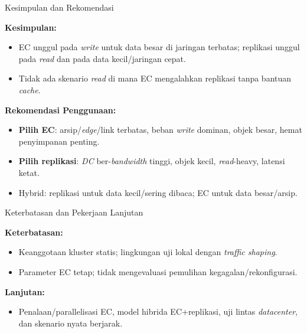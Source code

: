 \documentclass[a2,portrait]{config/poster/a0poster}
\newcommand{\postersection}[1]{%
	\begin{tcolorbox}[
		colback=ITBblue,
		colframe=ITBblue,
		fonttitle=\bfseries,
		coltext=white,
		sharp corners,
		boxrule=0pt,
		top=0pt,
		bottom=0pt,
		halign=center
	]
	\normalsize #1
	\end{tcolorbox}%
}
\begin{document}
\begin{multicols}{2}

\postersection{Kesimpulan dan Rekomendasi}
			\textbf{Kesimpulan:}
\begin{itemize}[leftmargin=*, itemsep=2pt]
	\item EC unggul pada \textit{write} untuk data besar di jaringan terbatas; replikasi unggul pada \textit{read} dan pada data kecil/jaringan cepat.
	\item Tidak ada skenario \textit{read} di mana EC mengalahkan replikasi tanpa bantuan \textit{cache}.
\end{itemize}
			\textbf{Rekomendasi Penggunaan:}
\begin{itemize}[leftmargin=*, itemsep=2pt]
	\item \textbf{Pilih EC}: arsip/\textit{edge}/link terbatas, beban \textit{write} dominan, objek besar, hemat penyimpanan penting.
	\item \textbf{Pilih replikasi}: \textit{DC} ber-\textit{bandwidth} tinggi, objek kecil, \textit{read}-heavy, latensi ketat.
	\item Hybrid: replikasi untuk data kecil/sering dibaca; EC untuk data besar/arsip.
\end{itemize}


\postersection{Keterbatasan dan Pekerjaan Lanjutan}
			\textbf{Keterbatasan:}
\begin{itemize}[leftmargin=*, itemsep=2pt]
	\item Keanggotaan kluster statis; lingkungan uji lokal dengan \textit{traffic shaping}.
	\item Parameter EC tetap; tidak mengevaluasi pemulihan kegagalan/rekonfigurasi.
\end{itemize}
			\textbf{Lanjutan:}
\begin{itemize}[leftmargin=*, itemsep=2pt]
	\item Penalaan/parallelisasi EC, model hibrida EC+replikasi, uji lintas \textit{datacenter}, dan skenario nyata berjarak.
\end{itemize}



\end{multicols}
\end{document}
